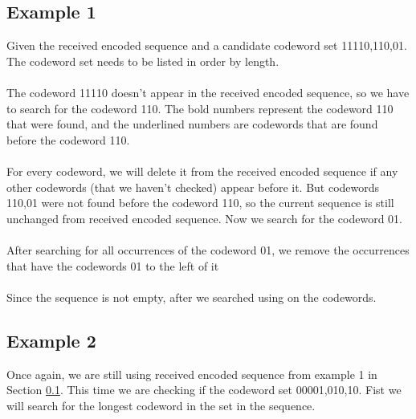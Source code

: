 \documentclass[10pt,letterpaper,notitlepage,draft]{article}
\theoremstyle{definition}
\begin{document}
\subsection{Example 1}\label{s1}
Given the received encoded sequence and a candidate codeword set {11110,110,01}. The codeword set needs to be listed in order by length.\\

\\

The codeword 11110 doesn't appear in the received encoded sequence, so we have to search for the codeword 110. 
The bold numbers represent the codeword 110 that were found, and the underlined numbers are codewords that are found before the codeword 110.\\

\\

For every codeword, we will delete it from the received encoded sequence if any other codewords (that we haven't checked) appear before it. 
But codewords {110,01} were not found before the codeword 110, so the current sequence is still unchanged from received encoded sequence. Now we search for the codeword 01. \\

\\

After searching for all occurrences of the codeword 01, we remove the occurrences that have the codewords {01} to the left of it\\

\\

Since the sequence is not empty, after we searched using on the codewords.

\subsection{Example 2}
Once again, we are still using received encoded sequence from example 1 in Section \ref{s1}.
This time we are checking if the codeword set {00001,010,10}.
Fist we will search for the longest codeword in the set in the sequence.\\
\end{document}
